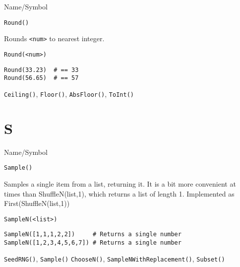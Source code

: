 \rl



\begin{desc}{Name/Symbol}
\item[Name/Symbol] 	\verb+Round()+

\item[Description] 	Rounds \verb+<num>+ to nearest integer.

\item[Usage]        	
\begin{verbatim}
Round(<num>)
\end{verbatim}

\item[Example]
\begin{verbatim}
Round(33.23)  # == 33
Round(56.65)  # == 57
\end{verbatim}

\item[See Also]     	\verb+Ceiling()+, \verb+Floor()+, \verb+AbsFloor()+, \verb+ToInt()+
\end{desc}

\rl

\section{S}
\rl

\begin{desc}{Name/Symbol}
\item[Name/Symbol]  	\verb+Sample()+

\item[Description] Samples a single item from a list, returning it.
  It is a bit more convenient at times than ShuffleN(list,1), which
  returns a list of length 1.  Implemented as First(ShuffleN(list,1))


\item[Usage]       	
\begin{verbatim}
SampleN(<list>)
\end{verbatim}

\item[Example]   	
\begin{verbatim}
SampleN([1,1,1,2,2])     # Returns a single number
SampleN([1,2,3,4,5,6,7]) # Returns a single number
\end{verbatim}

\item[See Also]    	\verb+SeedRNG()+, \verb+Sample()+ \verb+ChooseN()+, \verb+SampleNWithReplacement()+, \verb+Subset()+
\end{desc}

